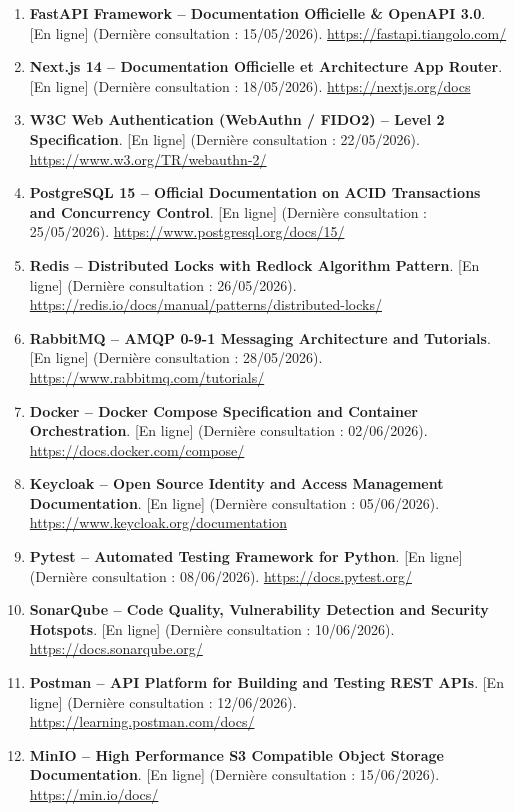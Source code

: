 \documentclass[12pt,a4paper,oneside]{report}
\begin{document}
\begin{enumerate}
    \item \textbf{FastAPI Framework -- Documentation Officielle \& OpenAPI 3.0}. [En ligne] (Dernière consultation : 15/05/2026). \url{https://fastapi.tiangolo.com/}
    \item \textbf{Next.js 14 -- Documentation Officielle et Architecture App Router}. [En ligne] (Dernière consultation : 18/05/2026). \url{https://nextjs.org/docs}
    \item \textbf{W3C Web Authentication (WebAuthn / FIDO2) -- Level 2 Specification}. [En ligne] (Dernière consultation : 22/05/2026). \url{https://www.w3.org/TR/webauthn-2/}
    \item \textbf{PostgreSQL 15 -- Official Documentation on ACID Transactions and Concurrency Control}. [En ligne] (Dernière consultation : 25/05/2026). \url{https://www.postgresql.org/docs/15/}
    \item \textbf{Redis -- Distributed Locks with Redlock Algorithm Pattern}. [En ligne] (Dernière consultation : 26/05/2026). \url{https://redis.io/docs/manual/patterns/distributed-locks/}
    \item \textbf{RabbitMQ -- AMQP 0-9-1 Messaging Architecture and Tutorials}. [En ligne] (Dernière consultation : 28/05/2026). \url{https://www.rabbitmq.com/tutorials/}
    \item \textbf{Docker -- Docker Compose Specification and Container Orchestration}. [En ligne] (Dernière consultation : 02/06/2026). \url{https://docs.docker.com/compose/}
    \item \textbf{Keycloak -- Open Source Identity and Access Management Documentation}. [En ligne] (Dernière consultation : 05/06/2026). \url{https://www.keycloak.org/documentation}
    \item \textbf{Pytest -- Automated Testing Framework for Python}. [En ligne] (Dernière consultation : 08/06/2026). \url{https://docs.pytest.org/}
    \item \textbf{SonarQube -- Code Quality, Vulnerability Detection and Security Hotspots}. [En ligne] (Dernière consultation : 10/06/2026). \url{https://docs.sonarqube.org/}
    \item \textbf{Postman -- API Platform for Building and Testing REST APIs}. [En ligne] (Dernière consultation : 12/06/2026). \url{https://learning.postman.com/docs/}
    \item \textbf{MinIO -- High Performance S3 Compatible Object Storage Documentation}. [En ligne] (Dernière consultation : 15/06/2026). \url{https://min.io/docs/}

\end{enumerate}
\end{document}
